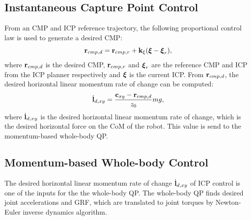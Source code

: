 \subsection{Instantaneous Capture Point Control}\label{sec:icpcontrol}
From an \ac{CMP} and \ac{ICP} reference trajectory, the following proportional control law is used to generate a desired \ac{CMP}:
\begin{equation}
    \mathbf{r}_{cmp,d}=\mathbf{r}_{cmp,r} + \mathbf{k}_{\xi}(\boldsymbol{\xi}-\boldsymbol{\xi}_r),
    \label{eq:rcmpd}
\end{equation}
where $\mathbf{r}_{cmp,d}$ is the desired \ac{CMP}, $\mathbf{r}_{cmp,r}$ and $\boldsymbol{\xi}_r$ are the reference \ac{CMP} and \ac{ICP} from the \ac{ICP} planner respectively and $\boldsymbol{\xi}$ is the current \ac{ICP}. From $\mathbf{r}_{cmp,d}$, the desired horizontal linear momentum rate of change can be computed:
\begin{equation}\label{eq:dotldxy}
    \dot{\mathbf{l}}_{d,xy} = \frac{\mathbf{c}_{xy}-\mathbf{r}_{cmp,d}}{z_0}mg,
\end{equation}
where $\dot{\mathbf{l}}_{d,xy}$ is the desired horizontal linear momentum rate of change, which is the desired horizontal force on the \ac{CoM} of the robot. This value is send to the momentum-based whole-body \ac{QP}. 

\subsection{Momentum-based Whole-body Control}
The desired horizontal linear momentum rate of change $\dot{\mathbf{l}}_{d,xy}$ of \ac{ICP} control is one of the inputs for the the whole-body \ac{QP}. The whole-body \ac{QP} finds desired joint accelerations and \ac{GRF}, which are translated to joint torques by Newton-Euler inverse dynamics algorithm.
